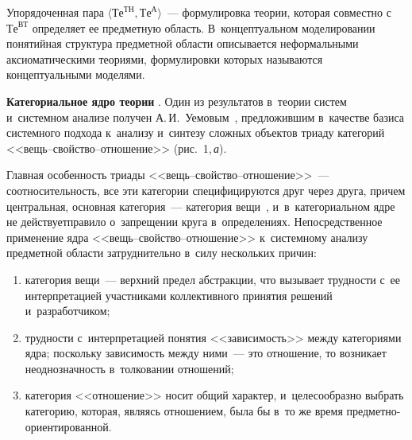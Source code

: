 \begin{multicols}{2}
  Упорядоченная пара $\langle \mathrm{Те}^{\mathrm{ТН}}, 
  \mathrm{Те}^{\mathrm{А}}\rangle$~--- формулировка теории, которая 
совместно с~$\mathrm{Те}^{\mathrm{ВТ}}$ определяет ее предметную область. В~концептуальном 
моделировании понятийная структура предметной области описывается неформальными 
аксиоматическими теориями, формулировки которых называются концептуальными 
моделями.
  
  \noindent
  \textbf{Категориальное ядро теории} {}. Один из результатов 
в~теории систем и~системном анализе получен А.\,И.~Уемовым~\cite{11-kir}, 
предложившим в~качестве базиса системного подхода к~анализу и~синтезу сложных объектов 
триаду категорий <<вещь--свой\-ст\-во--от\-но\-ше\-ние>> (рис.~1,\,\textit{а}).
  
  Главная особенность триады <<вещь--свой\-ст\-во--от\-но\-ше\-ние>>~--- 
соотносительность, все эти категории специфицируются друг через друга, причем 
центральная, основная категория~--- категория вещи~\cite{11-kir}, и~в~категориальном ядре 
не действует\linebreak правило о~запрещении круга в~определениях. Непо\-средственное применение 
ядра <<вещь--свой\-ст\-во--от\-но\-ше\-ние>> к~системному анализу предметной области 
затруднительно в~силу нескольких причин: 
\begin{enumerate}[(1)]
\item категория вещи~--- верхний предел 
абстракции, что вызывает трудности с~ее интерпретацией участниками коллективного 
принятия решений и~разработчиком; 
\item трудности с~интерпретацией понятия 
<<зависимость>> между категориями ядра; поскольку зависимость между ними~--- это 
отношение, то возникает неоднозначность в~толковании отношений; 




\item категория 
<<отношение>> носит общий характер, и~целесообразно выбрать категорию, которая, 
являясь отношением, была бы в~то же время пред\-мет\-но-ори\-ен\-ти\-ро\-ван\-ной. 
\end{enumerate}

\begin{center}  %
\vspace*{-1pt}
\mbox{%
 \epsfxsize=77.662mm
 }

\end{center}

\vspace*{-4pt}


\end{multicols}
